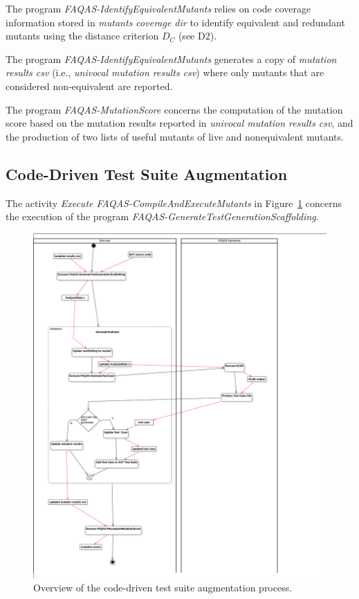 The program \emph{FAQAS-IdentifyEquivalentMutants} relies on code coverage information stored in \emph{mutants coverage dir} to identify equivalent and redundant mutants using the distance criterion $D_C$ (see D2).

The program \emph{FAQAS-IdentifyEquivalentMutants} generates a copy of \emph{mutation results csv} (i.e., \emph{univocal mutation results csv}) where only mutants that are considered non-equivalent are reported.

The program \emph{FAQAS-MutationScore} concerns the computation of the mutation score based on the mutation results reported in \emph{univocal mutation results csv}, and the production of two lists of useful mutants of live and nonequivalent mutants.


\subsection{Code-Driven Test Suite Augmentation}

The activity \emph{Execute FAQAS-CompileAndExecuteMutants} in Figure~\ref{fig:process:codeDriven:augmentation} concerns the execution of the program \emph{FAQAS-GenerateTestGenerationScaffolding}.

\begin{figure}[h]
  \centering
	\includegraphics[width=\textwidth]{images/png/Activity1!CodeDrivenTestSuiteAugmentation_2.png}
      \caption{Overview of the code-driven test suite augmentation process.}
      \label{fig:process:codeDriven:augmentation}
\end{figure}

